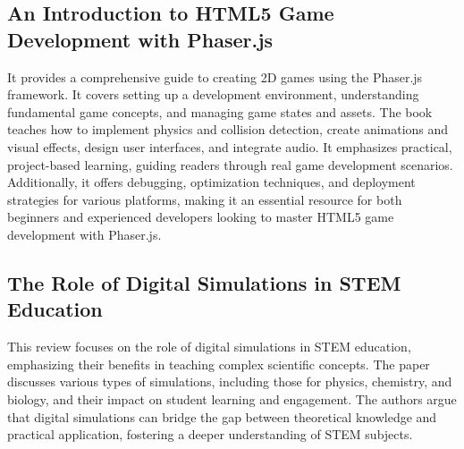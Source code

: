 \subsection*{An Introduction to HTML5 Game Development with Phaser.js}
It provides a comprehensive guide to creating 2D games using the Phaser.js framework. It covers setting up a development environment, understanding fundamental game concepts, and managing game states and assets. The book teaches how to implement physics and collision detection, create animations and visual effects, design user interfaces, and integrate audio. It emphasizes practical, project-based learning, guiding readers through real game development scenarios. Additionally, it offers debugging, optimization techniques, and deployment strategies for various platforms, making it an essential resource for both beginners and experienced developers looking to master HTML5 game development with Phaser.js.\cite{faas2017introduction}

\subsection*{The Role of Digital Simulations in STEM Education}
This review focuses on the role of digital simulations in STEM education, emphasizing their benefits in teaching complex scientific concepts. The paper discusses various types of simulations, including those for physics, chemistry, and biology, and their impact on student learning and engagement. The authors argue that digital simulations can bridge the gap between theoretical knowledge and practical application, fostering a deeper understanding of STEM subjects.\cite{smith2020digital}

